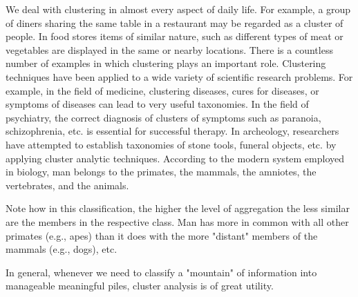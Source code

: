 \documentclass[a4paper,12pt]{article}
\begin{document}
We deal with clustering in almost every aspect of daily life. For example, a group of diners sharing the same table in a restaurant may be regarded as a cluster of people. In food stores items of similar nature, such as different types of meat or vegetables are displayed in the same or nearby locations. There is a countless number of examples in which clustering plays an important role. Clustering techniques have been applied to a wide variety of scientific research problems. For example, in the field of medicine, clustering diseases, cures for diseases, or symptoms of diseases can lead to very useful taxonomies. In the field of psychiatry, the correct diagnosis of clusters of symptoms such as paranoia, schizophrenia, etc. is essential for successful therapy. In archeology, researchers have attempted to establish taxonomies of stone tools, funeral objects, etc. by applying cluster analytic techniques. According to the modern system employed in biology, man belongs to the primates, the mammals, the amniotes, the vertebrates, and the animals.

Note how in this classification, the higher the level of aggregation the less similar are the members in the respective class. Man has more in common with all other primates (e.g., apes) than it does with the more "distant" members of the mammals (e.g., dogs), etc.

In general, whenever we need to classify a "mountain" of information into manageable meaningful piles, cluster analysis is of great utility.
\end{document}
